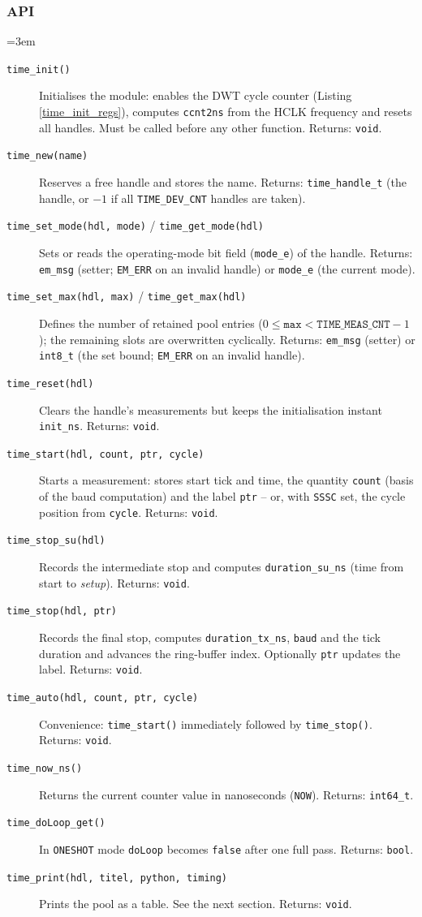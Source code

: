 \subsubsection*{API}
{\sloppy\emergencystretch=3em
\begin{description}
\item[\texttt{time\_init()}] Initialises the module: enables the DWT cycle
  counter (Listing \ref{time_init_regs}), computes \verb|ccnt2ns| from the
  HCLK frequency and resets all handles. Must be called before any other
  function. Returns: \verb|void|.
\item[\texttt{time\_new(name)}] Reserves a free handle and stores the name.
  Returns: \verb|time_handle_t| (the handle, or $-1$ if all
  \verb|TIME_DEV_CNT| handles are taken).
\item[\texttt{time\_set\_mode(hdl, mode)} / \texttt{time\_get\_mode(hdl)}]
  Sets or reads the operating-mode bit field (\verb|mode_e|) of the handle.
  Returns: \verb|em_msg| (setter; \verb|EM_ERR| on an invalid handle) or
  \verb|mode_e| (the current mode).
\item[\texttt{time\_set\_max(hdl, max)} / \texttt{time\_get\_max(hdl)}]
  Defines the number of retained pool entries ($0 \le \mathtt{max} <
  \mathtt{TIME\_MEAS\_CNT}-1$); the remaining slots are overwritten
  cyclically. Returns: \verb|em_msg| (setter) or \verb|int8_t| (the set bound;
  \verb|EM_ERR| on an invalid handle).
\item[\texttt{time\_reset(hdl)}] Clears the handle's measurements but keeps the
  initialisation instant \verb|init_ns|. Returns: \verb|void|.
\item[\texttt{time\_start(hdl, count, ptr, cycle)}] Starts a measurement:
  stores start tick and time, the quantity \verb|count| (basis of the baud
  computation) and the label \verb|ptr| -- or, with \verb|SSSC| set, the cycle
  position from \verb|cycle|. Returns: \verb|void|.
\item[\texttt{time\_stop\_su(hdl)}] Records the intermediate stop and computes
  \verb|duration_su_ns| (time from start to \emph{setup}). Returns: \verb|void|.
\item[\texttt{time\_stop(hdl, ptr)}] Records the final stop, computes
  \verb|duration_tx_ns|, \verb|baud| and the tick duration and advances the
  ring-buffer index. Optionally \verb|ptr| updates the label. Returns:
  \verb|void|.
\item[\texttt{time\_auto(hdl, count, ptr, cycle)}] Convenience:
  \verb|time_start()| immediately followed by \verb|time_stop()|. Returns:
  \verb|void|.
\item[\texttt{time\_now\_ns()}] Returns the current counter value in
  nanoseconds (\verb|NOW|). Returns: \verb|int64_t|.
\item[\texttt{time\_doLoop\_get()}] In \verb|ONESHOT| mode \verb|doLoop|
  becomes \verb|false| after one full pass. Returns: \verb|bool|.
\item[\texttt{time\_print(hdl, titel, python, timing)}] Prints the pool as a
  table. See the next section. Returns: \verb|void|.
\end{description}
\par}

